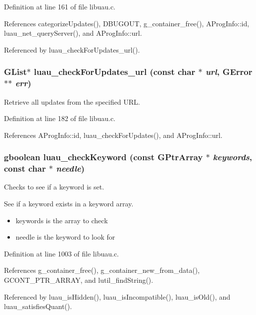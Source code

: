 Definition at line 161 of file libuau.c.

References categorize\-Updates(), DBUGOUT, g\_\-container\_\-free(), AProg\-Info::id, luau\_\-net\_\-query\-Server(), and AProg\-Info::url.

Referenced by luau\_\-check\-For\-Updates\_\-url().
\subsubsection{\setlength{\rightskip}{0pt plus 5cm}GList$\ast$ luau\_\-check\-For\-Updates\_\-url (const char $\ast$ {\em url}, GError $\ast$$\ast$ {\em err})}\label{libuau_8h_a54}


Retrieve all updates from the specified URL. 



Definition at line 182 of file libuau.c.

References AProg\-Info::id, luau\_\-check\-For\-Updates(), and AProg\-Info::url.
\subsubsection{\setlength{\rightskip}{0pt plus 5cm}gboolean luau\_\-check\-Keyword (const GPtr\-Array $\ast$ {\em keywords}, const char $\ast$ {\em needle})}\label{libuau_8h_a80}


Checks to see if a keyword is set. 

See if a keyword exists in a keyword array.

\begin{itemize}
\item keywords is the array to check \item needle is the keyword to look for 
\end{itemize}


Definition at line 1003 of file libuau.c.

References g\_\-container\_\-free(), g\_\-container\_\-new\_\-from\_\-data(), GCONT\_\-PTR\_\-ARRAY, and lutil\_\-find\-String().

Referenced by luau\_\-is\-Hidden(), luau\_\-is\-Incompatible(), luau\_\-is\-Old(), and luau\_\-satisfies\-Quant().
